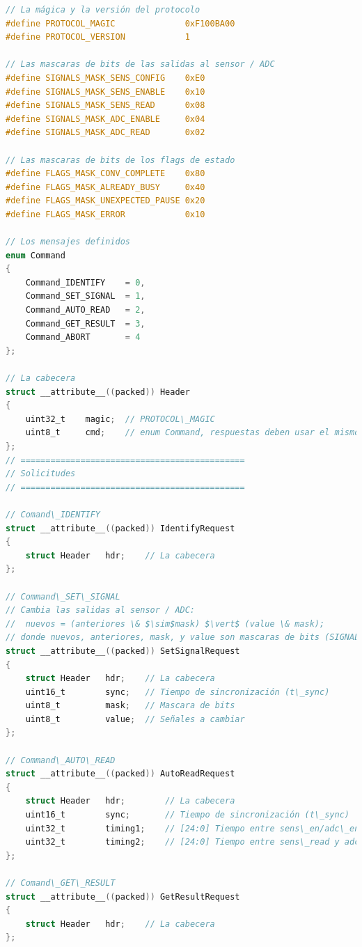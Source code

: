 \documentclass[a4paper, twoside, 11pt]{report}
\begin{document}
\begin{lstlisting}[language=C, style=CStyle, texcl=true]
// La mágica y la versión del protocolo
#define PROTOCOL_MAGIC              0xF100BA00
#define PROTOCOL_VERSION            1

// Las mascaras de bits de las salidas al sensor / ADC
#define SIGNALS_MASK_SENS_CONFIG    0xE0
#define SIGNALS_MASK_SENS_ENABLE    0x10
#define SIGNALS_MASK_SENS_READ      0x08
#define SIGNALS_MASK_ADC_ENABLE     0x04
#define SIGNALS_MASK_ADC_READ       0x02

// Las mascaras de bits de los flags de estado
#define FLAGS_MASK_CONV_COMPLETE    0x80
#define FLAGS_MASK_ALREADY_BUSY     0x40
#define FLAGS_MASK_UNEXPECTED_PAUSE 0x20
#define FLAGS_MASK_ERROR            0x10

// Los mensajes definidos
enum Command
{
    Command_IDENTIFY    = 0,
    Command_SET_SIGNAL  = 1,
    Command_AUTO_READ   = 2,
    Command_GET_RESULT  = 3,
    Command_ABORT       = 4
};

// La cabecera
struct __attribute__((packed)) Header
{
    uint32_t    magic;  // PROTOCOL\_MAGIC
    uint8_t     cmd;    // enum Command, respuestas deben usar el mismo que el solicitud
};
// =============================================
// Solicitudes
// =============================================

// Comand\_IDENTIFY
struct __attribute__((packed)) IdentifyRequest
{
    struct Header   hdr;    // La cabecera
};

// Command\_SET\_SIGNAL
// Cambia las salidas al sensor / ADC:
//  nuevos = (anteriores \& $\sim$mask) $\vert$ (value \& mask);
// donde nuevos, anteriores, mask, y value son mascaras de bits (SIGNALS\_MASK\_...)
struct __attribute__((packed)) SetSignalRequest
{
    struct Header   hdr;    // La cabecera
    uint16_t        sync;   // Tiempo de sincronización (t\_sync)
    uint8_t         mask;   // Mascara de bits
    uint8_t         value;  // Señales a cambiar
};

// Command\_AUTO\_READ
struct __attribute__((packed)) AutoReadRequest
{
    struct Header   hdr;        // La cabecera
    uint16_t        sync;       // Tiempo de sincronización (t\_sync)
    uint32_t        timing1;    // [24:0] Tiempo entre sens\_en/adc\_en y sens\_read
    uint32_t        timing2;    // [24:0] Tiempo entre sens\_read y adc\_read
};

// Comand\_GET\_RESULT
struct __attribute__((packed)) GetResultRequest
{
    struct Header   hdr;    // La cabecera
};


\end{lstlisting}
\end{document}
